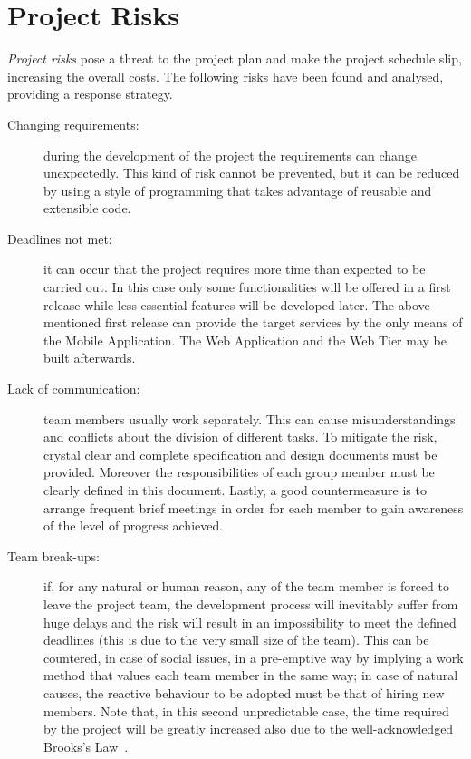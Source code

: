 \section{Project Risks}
\textit{Project risks} pose a threat to the project plan and make the project schedule slip, increasing the overall costs.
The following risks have been found and analysed, providing a response strategy. 
\begin{description}
\item[Changing requirements:] during the development of the project the requirements can change unexpectedly. This kind of risk cannot be prevented, but it can be reduced by using a style of programming that takes advantage of reusable and extensible code.
\item[Deadlines not met:] it can occur that the project requires more time than expected to be carried out. In this case only some functionalities will be offered in a first release while less essential features will be developed later. The above-mentioned first release can provide the target services by the only means of the Mobile Application. The Web Application and the Web Tier may be built afterwards.
\item[Lack of communication:] team members usually work separately. This can cause misunderstandings and conflicts about the division of different tasks. To mitigate the risk, crystal clear and complete specification and design documents must be provided. Moreover the responsibilities of each group member must be clearly defined in this document. Lastly, a good countermeasure is to arrange frequent brief meetings in order for each member to gain awareness of the level of progress achieved.
\item[Team break-ups:] if, for any natural or human reason, any of the team member is forced to leave the project team, the development process will inevitably suffer from huge delays and the risk will result in an impossibility to meet the defined deadlines (this is due to the very small size of the team). This can be countered, in case of social issues, in a pre-emptive way by implying a work method that values each team member in the same way; in case of natural causes, the reactive behaviour to be adopted must be that of hiring new members. Note that, in this second unpredictable case, the time required by the project will be greatly increased also due to the well-acknowledged Brooks's Law~\cite{mythical-man-month}.
\end{description}

